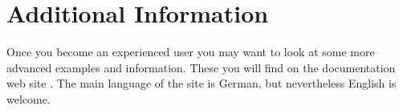 \section{Additional Information}

Once you become an experienced {\KOMAScript} user you may want to look at some
more advanced examples and information. These you will find on the
{\KOMAScript} documentation web site \cite{homepage}. The main language of the
site is German, but nevertheless English is welcome.

\endinput
